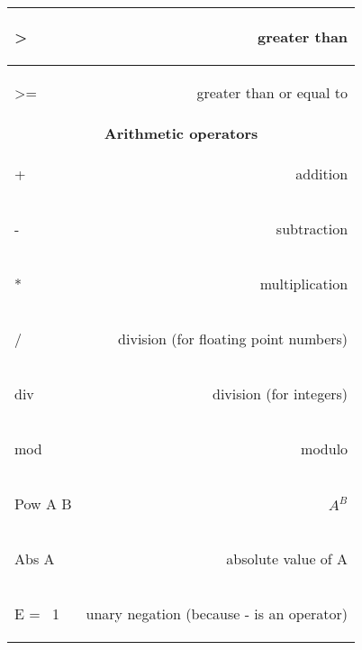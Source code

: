 \documentclass[12pt]{article}
\begin{document}
\begin{longtable}{l r}
\begin{oz}
>
\end{oz}
&greater than\\
\hline
 
\begin{oz}
>=
\end{oz}
&greater than or equal to\\[0.4em]


\midrule[0.3mm]
\multicolumn{2}{c}{\textbf{Arithmetic operators}}\\
\midrule[0.3mm]



\begin{oz}
+
\end{oz}
&addition\\
\hline
 
\begin{oz}
-
\end{oz}
&subtraction\\
\hline
 
\begin{oz}
*
\end{oz}
&multiplication\\
\hline
 
\begin{oz}
/
\end{oz}
&division (for floating point numbers)\\
\hline
 
\begin{oz}
div
\end{oz}
&division (for integers)\\
\hline
 
\begin{oz}
mod
\end{oz}
&modulo\\
\hline
 
\begin{oz}
{Pow A B}
\end{oz}
&$A^{B}$\\
\hline
 
\begin{oz}
{Abs A}
\end{oz}
&absolute value of A\\
\hline

\begin{oz}
E = ~1
\end{oz}
&unary negation (because - is an operator) \\[0.4em]

 
 

\end{longtable}
\end{document}
